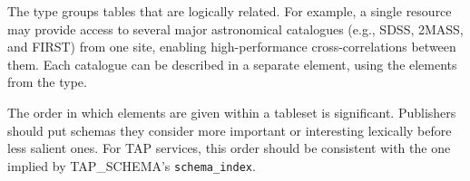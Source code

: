 \documentclass[11pt,a4paper]{ivoa}
\begin{document}


The  type groups
tables that are logically related.
For example, a single
resource may provide access to several major astronomical catalogues
(e.g., SDSS, 2MASS, and FIRST) from one site, enabling high-performance
cross-correlations between them.  Each catalogue can be described in a
separate  element, using the elements from
the  type.

The order in which  elements are given within a tableset
is significant.  Publishers should put schemas they consider more
important or interesting lexically before less salient ones.  For TAP
services, this order should be consistent with the one implied by
TAP\_SCHEMA's \verb|schema_index|.


\end{document}
